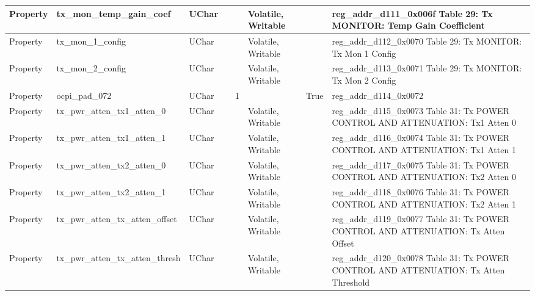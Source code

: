 \documentclass{article}
\begin{document}
\begin{scriptsize}
\begin{longtable}{|p{2cm}|p{5cm}|p{1cm}|p{2cm}|p{2cm}|p{1.75cm}|p{1.5cm}|p{5.1cm}|}
  \hline
  Property & tx\_mon\_temp\_gain\_coef                                & UChar &                  &                  & Volatile,  Writable &         & reg\_addr\_d111\_0x006f Table 29: Tx MONITOR: Temp Gain Coefficient \\
  \hline
  Property & tx\_mon\_1\_config                                       & UChar &                  &                  & Volatile,  Writable &         & reg\_addr\_d112\_0x0070 Table 29: Tx MONITOR: Tx Mon 1 Config \\
  \hline
  Property & tx\_mon\_2\_config                                       & UChar &                  &                  & Volatile,  Writable &         & reg\_addr\_d113\_0x0071 Table 29: Tx MONITOR: Tx Mon 2 Config \\
  \hline
  Property & ocpi\_pad\_072                                           & UChar &                  & 1                &                     & True    & reg\_addr\_d114\_0x0072 \\
  \hline
  Property & tx\_pwr\_atten\_tx1\_atten\_0                            & UChar &                  &                  & Volatile,  Writable &         & reg\_addr\_d115\_0x0073 Table 31: Tx POWER CONTROL AND ATTENUATION: Tx1 Atten 0 \\
  \hline
  Property & tx\_pwr\_atten\_tx1\_atten\_1                            & UChar &                  &                  & Volatile,  Writable &         & reg\_addr\_d116\_0x0074 Table 31: Tx POWER CONTROL AND ATTENUATION: Tx1 Atten 1 \\
  \hline
  Property & tx\_pwr\_atten\_tx2\_atten\_0                            & UChar &                  &                  & Volatile,  Writable &         & reg\_addr\_d117\_0x0075 Table 31: Tx POWER CONTROL AND ATTENUATION: Tx2 Atten 0 \\
  \hline
  Property & tx\_pwr\_atten\_tx2\_atten\_1                            & UChar &                  &                  & Volatile,  Writable &         & reg\_addr\_d118\_0x0076 Table 31: Tx POWER CONTROL AND ATTENUATION: Tx2 Atten 1 \\
  \hline
  Property & tx\_pwr\_atten\_tx\_atten\_offset                        & UChar &                  &                  & Volatile,  Writable &         & reg\_addr\_d119\_0x0077 Table 31: Tx POWER CONTROL AND ATTENUATION: Tx Atten Offset \\
  \hline
  Property & tx\_pwr\_atten\_tx\_atten\_thresh                        & UChar &                  &                  & Volatile,  Writable &         & reg\_addr\_d120\_0x0078 Table 31: Tx POWER CONTROL AND ATTENUATION: Tx Atten Threshold \\

\end{longtable}
\end{scriptsize}
\end{document}
